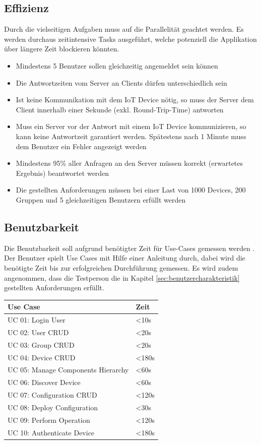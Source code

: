 \subsection{Effizienz}
Durch die vielseitigen Aufgaben muss auf die Parallelität geachtet werden. Es werden durchaus zeitintensive Tasks ausgeführt, welche potenziell die Applikation über längere Zeit blockieren könnten.

\begin{itemize}
\item Mindestens 5 Benutzer sollen gleichzeitig angemeldet sein können
\item Die Antwortzeiten vom Server an Clients dürfen unterschiedlich sein  
\item Ist keine Kommunikation mit dem IoT Device nötig, so muss der Server dem Client innerhalb einer Sekunde (exkl. Round-Trip-Time) antworten
\item Muss ein Server vor der Antwort mit einem IoT Device kommunizieren, so kann keine Antwortzeit garantiert werden. Spätestens nach 1 Minute muss dem Benutzer ein Fehler angezeigt werden
\item Mindestens 95\% aller Anfragen an den Server müssen korrekt (erwartetes Ergebnis) beantwortet werden
\item Die gestellten Anforderungen müssen bei einer Last von 1000 Devices, 200 Gruppen und 5 gleichzeitigen Benutzern erfüllt werden
\end{itemize}
\newpage

\subsection{Benutzbarkeit}
Die Benutzbarkeit soll aufgrund benötigter Zeit für Use-Cases gemessen werden \cite{ReinhardSteiner}. Der Benutzer spielt Use Cases mit Hilfe einer Anleitung durch, dabei wird die benötigte Zeit bis zur erfolgreichen Durchführung gemessen. Es wird zudem angenommen, dass die Testperson die in Kapitel \ref{sec:benutzercharakteristik} gestellten Anforderungen erfüllt.

\begin{center}
\begin{longtable}{| p{8cm} | p{2.5cm} |}
\hline
\textbf{Use Case} 						& \textbf{Zeit}\\ \hline
UC 01: Login User    					& <10s \\ \hline
UC 02: User CRUD			 			& <20s \\ \hline
UC 03: Group CRUD	         			& <20s \\ \hline 
UC 04: Device CRUD               		& <180s \\ \hline 
UC 05: Manage Components Hierarchy		& <60s \\ \hline 
UC 06: Discover Device     				& <60s \\ \hline
UC 07: Configuration CRUD			 	& <120s \\ \hline
UC 08: Deploy Configuration				& <30s \\ \hline
UC 09: Perform Operation			 	& <120s \\ \hline
UC 10: Authenticate Device	 			& <180s \\ \hline
\end{longtable}
\end{center}
